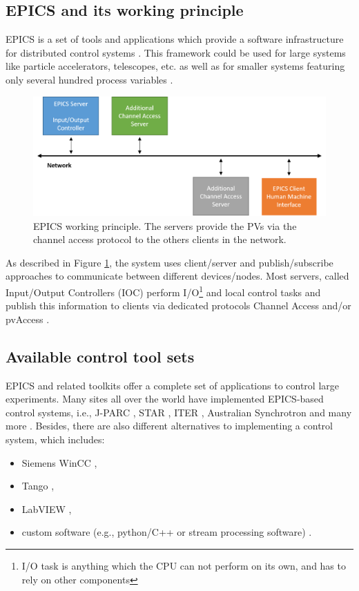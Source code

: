 


\subsection{EPICS and its working principle} 
\label{EPICS}
EPICS is a set of tools and applications which provide a software infrastructure for distributed control systems \cite{EPICS_license}. This framework could be used for large systems like particle accelerators, telescopes, etc. as well as for smaller systems featuring only several hundred process variables \cite{EPICS_1, EPICS_2, EPICS_3, EPICS_4}.
\begin{figure}[!h]
\centering
\includegraphics[width=0.7\columnwidth]{Chapter3/Controls/images/EPICS.png}
\caption{EPICS working principle. The servers provide the \glspl{PV} via the channel access protocol to the others clients in the network.}
\label{fig_EPICS}
\end{figure}

As described in Figure \ref{fig_EPICS}, the system uses client/server and publish/subscribe approaches to communicate between different devices/nodes. Most servers, called Input/Output Controllers (\gls{IOC}) perform I/O\footnote{ I/O task is anything which the CPU can not perform on its own, and has to rely on other components} and local control tasks and publish this information to clients via dedicated protocols Channel Access and/or pvAccess \cite{EPICS}. 

 \subsection{Available control tool sets}
 EPICS and related toolkits offer a complete set of applications to control large experiments. Many sites all over the world have implemented \gls{EPICS}-based control systems, i.e., \gls{J-PARC} \cite{J-PARC}, \gls{STAR} \cite{STAR}, \gls{ITER} \cite{ITER}, Australian Synchrotron and many more \cite{EPICS_site}. Besides, there are also different alternatives to implementing a control system, which includes: 
 \begin{itemize}
     \item Siemens WinCC \cite{Camacho:2022fxa,Goralczyk:2022udx},
     \item Tango \cite{Santander-Vela:2021tma},
     \item LabVIEW \cite{State:2022qlw},
     \item custom software (e.g., python/C++ or stream processing software) \cite{taurus}.
 \end{itemize} 
 
